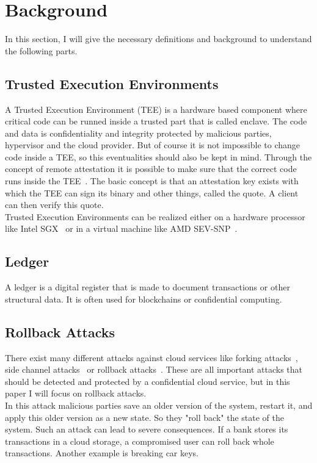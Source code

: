 \section{Background}
In this section, I will give the necessary definitions and background to understand the following parts. 
\subsection{Trusted Execution Environments}
A Trusted Execution Environment (TEE) is a hardware based component where critical code can be runned inside a trusted part that is called enclave. The code and data is confidentiality and integrity protected by malicious parties, hypervisor and the cloud provider.  But of course it is not impossible to change code inside a TEE, so this eventualities should also be kept in mind. Through the concept of remote attestation it is possible to make sure that the correct code runs inside the TEE~\cite{remoteAttestation}.  The basic concept is that an attestation key exists with which the TEE can sign its binary and other things, called the quote. A client can then verify this quote. \\ %
Trusted Execution Environments can be realized either on a hardware processor like Intel SGX~\cite{sgx} or in a virtual machine like AMD SEV-SNP~\cite{amd}.%
\subsection{Ledger}
A ledger is a digital register that is made to document transactions or other structural data. It is often used for blockchains or confidential computing. %
\subsection{Rollback Attacks}
There exist many different attacks against cloud services like forking attacks~\cite{forkingAttacks}, side channel attacks~\cite{sideChannel} or rollback attacks~\cite{Rollback}. These are all important attacks that should be detected and protected by a confidential cloud service, but in this paper I will focus on rollback attacks.\\
In this attack malicious parties save an older version of the system, restart it, and apply this older version as a new state. So they "roll back" the state of the system. Such an attack can lead to severe consequences. If a bank stores its transactions in a cloud storage, a compromised user can roll back whole transactions. Another example is breaking car keys. %